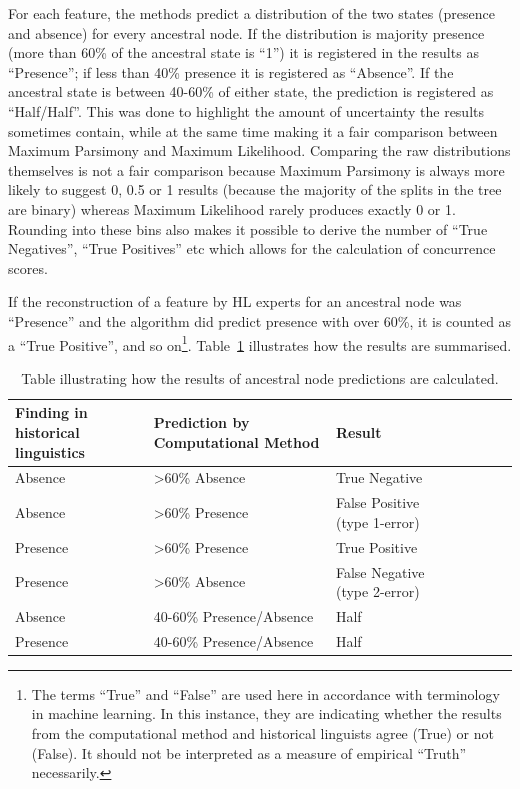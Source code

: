 \documentclass[12pt,letterpaper]{article}
\begin{document}
For each feature, the methods predict a distribution of the two states (presence and absence) for every ancestral node. If the distribution is majority presence (more than 60\% of the ancestral state is ``1'') it is registered in the results as ``Presence''; if less than 40\% presence it is registered as ``Absence''. If the ancestral state is between 40-60\% of either state, the prediction is registered as ``Half/Half''. This was done to highlight the amount of uncertainty the results sometimes contain, while at the same time making it a fair comparison between Maximum Parsimony and Maximum Likelihood. Comparing the raw distributions themselves is not a fair comparison because Maximum Parsimony is always more likely to suggest 0, 0.5 or 1 results (because the majority of the splits in the tree are binary) whereas Maximum Likelihood rarely produces exactly 0 or 1. Rounding into these bins also makes it possible to derive the number of ``True Negatives'', ``True Positives'' etc which allows for the calculation of concurrence scores.

If the reconstruction of a feature by HL experts for an ancestral node was ``Presence'' and the algorithm did predict presence with over 60\%, it is counted as a ``True Positive'', and so on\footnote{The terms ``True'' and ``False'' are used here in accordance with terminology in machine learning. In this instance, they are indicating whether the results from the computational method and historical linguists agree (True) or not (False). It should not be interpreted as a measure of empirical ``Truth'' necessarily.}. Table~\ref{example_HL_prediction_table_true_positives} illustrates how the results are summarised.

\begin{table}[ht]
\centering
\caption{Table illustrating how the results of ancestral node predictions are calculated.}
\label{example_HL_prediction_table_true_positives}
\begin{tabular}{|p{4cm}|p{4cm}|p{6cm}|l|l|l|l|l|}
\hline
\textbf{Finding in historical linguistics} & \textbf{Prediction by Computational Method} & \textbf{Result} \\ \hline
Absence & >60\% Absence & True Negative \\ \hline
Absence & >60\% Presence & False Positive (type 1-error) \\ \hline
Presence & >60\% Presence & True Positive \\ \hline
Presence & >60\% Absence & False Negative (type 2-error) \\ \hline
Absence & 40-60\% Presence/Absence & Half \\ \hline
Presence & 40-60\% Presence/Absence & Half\\ \hline
\end{tabular}
\end{table}
\end{document}
